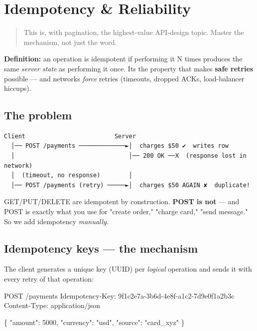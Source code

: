 \documentclass[11pt]{article}
\newenvironment{Shaded}{\begin{snugshade}}{\end{snugshade}}
\newcommand{\NormalTok}[1]{\textcolor[rgb]{0.81,0.81,0.76}{#1}}
\begin{document}
\section{Idempotency \& Reliability}\label{idempotency--reliability}

\begin{quote}
This is, with pagination, the highest-value API-design topic. Master the mechanism, not just the word.
\end{quote}

\textbf{Definition:} an operation is idempotent if performing it N times produces the same \emph{server state} as performing it once. It\textquotesingle s the property that makes \textbf{safe retries} possible --- and networks \emph{force} retries (timeouts, dropped ACKs, load-balancer hiccups).

\subsection{The problem}\label{the-problem}

\setcodelang{}

\begin{verbatim}
Client                         Server
  │── POST /payments ─────────────►│  charges $50 ✔  writes row
  │                                │── 200 OK ──X  (response lost in network)
  │  (timeout, no response)        │
  │── POST /payments (retry) ─────►│  charges $50 AGAIN ✘  duplicate!
\end{verbatim}

GET/PUT/DELETE are idempotent by construction. \textbf{POST is not} --- and POST is exactly what you use for "create order," "charge card," "send message." So we add idempotency \emph{manually}.

\subsection{Idempotency keys --- the mechanism}\label{idempotency-keys--the-mechanism}

The client generates a unique key (UUID) per \emph{logical} operation and sends it with every retry of that operation:


\begin{Shaded}
\begin{Highlighting}[]
\NormalTok{POST /payments}
\NormalTok{Idempotency{-}Key: 9f1c2e7a{-}3b6d{-}4e8f{-}a1c2{-}7d9e0f1a2b3c}
\NormalTok{Content{-}Type: application/json}

\NormalTok{\{ "amount": 5000, "currency": "usd", "source": "card\_xyz" \}}
\end{Highlighting}
\end{Shaded}
\end{document}
